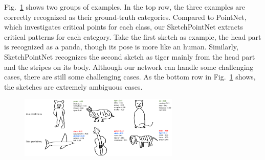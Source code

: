 Fig.~\ref{fig:resshow} shows two groups of examples.
In the top row, the three examples are correctly recognized as their ground-truth categories.
Compared to PointNet, which investigates critical points for each class, our SketchPointNet extracts critical patterns for each category.
%
Take the first sketch as example, the head part is recognized as a panda, though its pose is more like an human. Similarly, SketchPointNet recognizes the second sketch as tiger mainly from the head part and the stripes on its body.
%
Although our network can handle some challenging cases, there are still some challenging cases.
As the bottom row in Fig.~\ref{fig:resshow} shows, the sketches are extremely ambiguous cases.

\begin{figure}[htbp]
    \center
    \includegraphics[width=3in]{images/res.png}
    \label{fig:resshow}
\end{figure}
